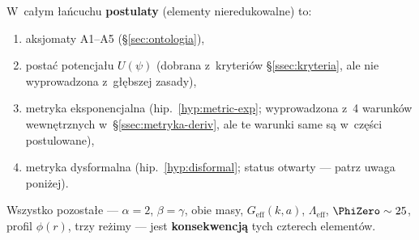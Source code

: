 \begin{remark}\label{rem:chain-status}
W~ca\l{}ym \l{}a\'ncuchu \textbf{postulaty} (elementy nieredukowalne)
to:
\begin{enumerate}[nosep]
  \item aksjomaty A1--A5 (\S\ref{sec:ontologia}),
  \item posta\'c potencja\l{}u $U(\psi)$
    (dobrana z~kryteri\'ow \S\ref{ssec:kryteria},
    ale nie wyprowadzona z~g\l{}\k{e}bszej zasady),
  \item metryka eksponencjalna (hip.~\ref{hyp:metric-exp};
    wyprowadzona z~4 warunk\'ow wewn\k{e}trznych
    w~\S\ref{ssec:metryka-deriv}, ale te warunki
    same s\k{a} w~cz\k{e}\'sci postulowane),
  \item metryka dysformalna (hip.~\ref{hyp:disformal}; status
    otwarty --- patrz uwaga poni\.zej).
\end{enumerate}
Wszystko pozosta\l{}e ---
$\alpha = 2$, $\beta = \gamma$, obie masy, $G_{\mathrm{eff}}(k,a)$,
$\Lambda_{\mathrm{eff}}$, $\PhiZero \sim 25$,
profil $\phi(r)$, trzy re\.zimy ---
jest \textbf{konsekwencj\k{a}} tych czterech
element\'ow.
\end{remark}


